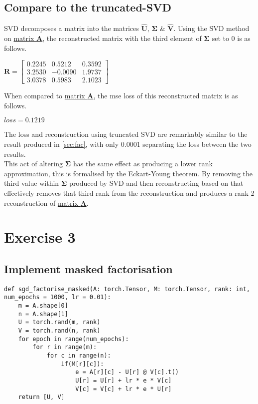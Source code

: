 \documentclass[sigconf]{acmart}
\begin{document}
\subsection{Compare to the truncated-SVD}
SVD decomposes a matrix into the matrices $\mathbf{\hat{U}}$, $\mathbf{\Sigma}$ \& $\mathbf{\hat{V}}$.
Using the SVD method on \hyperlink{mat:A}{matrix \textbf{A}}, the reconstructed matrix with the third element of $\mathbf{\Sigma}$ set to 0 is as follows. 
\begin{center}
    \begin{math}
        \mathbf{R} = \begin{bmatrix}
            0.2245 &  0.5212 &  0.3592 \\
            3.2530 & -0.0090 & 1.9737 \\
            3.0378 &  0.5983 & 2.1023 
        \end{bmatrix} 
    \end{math}  
\end{center}
When compared to \hyperlink{mat:A}{matrix \textbf{A}}, the mse loss of this reconstructed matrix is as follows.
\begin{center}
    \begin{math}
        loss = 0.1219
    \end{math} 
\end{center} 
The loss and reconstruction using truncated SVD are remarkably similar to the result produced in \ref{sec:fac}, with only 0.0001 separating the loss between the two results.
\\This act of altering $\mathbf{\Sigma}$ has the same effect as producing a lower rank approximation, this is formalised by the Eckart-Young theorem. By removing the third value within $\mathbf{\Sigma}$ produced by SVD and then reconstructing based on that effectively removes that third rank from the reconstruction and produces a rank 2 reconstruction of \hyperlink{mat:A}{matrix \textbf{A}}. 
\section{Exercise 3}
\subsection{Implement masked factorisation}
\begin{listing}[H]
    \begin{verbatim}
def sgd_factorise_masked(A: torch.Tensor, M: torch.Tensor, rank: int, num_epochs = 1000, lr = 0.01):
    m = A.shape[0]
    n = A.shape[1]
    U = torch.rand(m, rank)
    V = torch.rand(n, rank)
    for epoch in range(num_epochs):
        for r in range(m):
            for c in range(n):
                if(M[r][c]):
                    e = A[r][c] - U[r] @ V[c].t()
                    U[r] = U[r] + lr * e * V[c] 
                    V[c] = V[c] + lr * e * U[r]
    return [U, V]
    \end{verbatim}
\end{listing}
\end{document}
